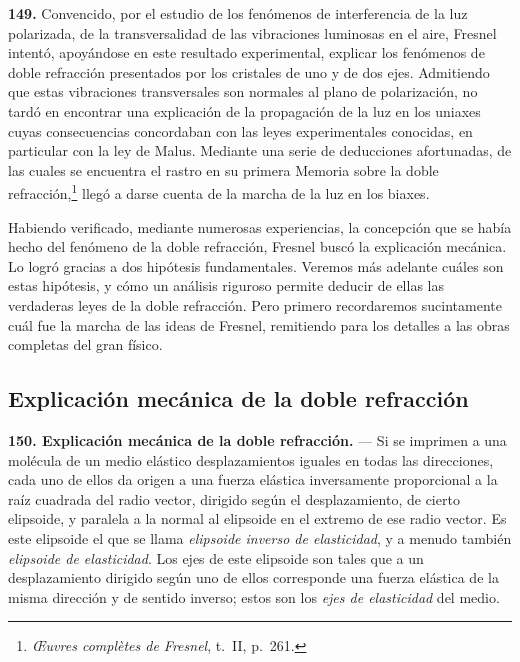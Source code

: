 \noindent\textbf{149.} Convencido, por el estudio de los fenómenos de
interferencia de la luz polarizada, de la transversalidad de las
vibraciones luminosas en el aire, Fresnel intentó, apoyándose en este
resultado experimental, explicar los fenómenos de doble refracción
presentados por los cristales de uno y de dos ejes. Admitiendo que estas
vibraciones transversales son normales al plano de polarización, no tardó
en encontrar una explicación de la propagación de la luz en los uniaxes
cuyas consecuencias concordaban con las leyes experimentales conocidas, en
particular con la ley de Malus. Mediante una serie de deducciones
afortunadas, de las cuales se encuentra el rastro en su primera Memoria
sobre la doble refracción,\footnote{\emph{Œuvres complètes de Fresnel},
t.~II, p.~261.} llegó a darse cuenta de la marcha de la luz en
los biaxes.

Habiendo verificado, mediante numerosas experiencias, la concepción que se
había hecho del fenómeno de la doble refracción, Fresnel buscó la
explicación mecánica. Lo logró gracias a dos hipótesis fundamentales.
Veremos más adelante cuáles son estas hipótesis, y cómo un análisis
riguroso permite deducir de ellas las verdaderas leyes de la doble
refracción. Pero primero recordaremos sucintamente cuál fue la marcha de
las ideas de Fresnel, remitiendo para los detalles a las obras completas
del gran físico.

\subsection{Explicación mecánica de la doble refracción}

\noindent\textbf{150. Explicación mecánica de la doble refracción.} — Si
se imprimen a una molécula de un medio elástico desplazamientos iguales en
todas las direcciones, cada uno de ellos da origen a una fuerza elástica
inversamente proporcional a la raíz cuadrada del radio vector, dirigido
según el desplazamiento, de cierto elipsoide, y paralela a la normal al
elipsoide en el extremo de ese radio vector. Es este elipsoide el que se
llama \emph{elipsoide inverso de elasticidad}, y a menudo también
\emph{elipsoide de elasticidad}. Los ejes de este elipsoide son tales que
a un desplazamiento dirigido según uno de ellos corresponde una fuerza
elástica de la misma dirección y de sentido inverso; estos son los
\emph{ejes de elasticidad} del medio.

